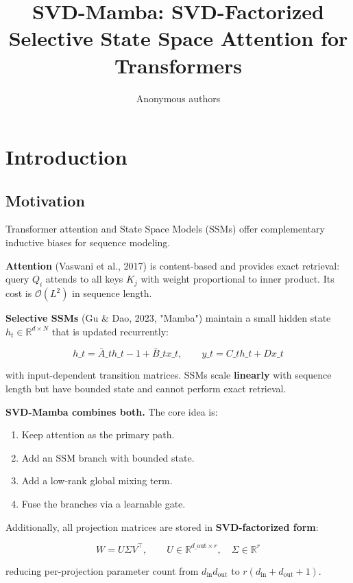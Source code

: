 \title{\textbf{SVD-Mamba: SVD-Factorized Selective State Space Attention for Transformers}}

\author{Anonymous authors}



\section{Introduction}

\subsection{Motivation}

Transformer attention and State Space Models (SSMs) offer complementary 
inductive biases for sequence modeling.

\textbf{Attention} (Vaswani et al., 2017) is content-based and provides exact 
retrieval: query $Q_i$ attends to all keys $K_j$ with weight proportional 
to inner product. Its cost is $\mathcal{O}(L^2)$ in sequence length.

\textbf{Selective SSMs} (Gu \& Dao, 2023, "Mamba") maintain a small hidden state 
$h_t \in \mathbb{R}^{d \times N}$ that is updated recurrently:

\[
h\_t = \bar{A}\_t h\_{t-1} + \bar{B}\_t x\_t, \qquad
y\_t = C\_t h\_t + D x\_t
\tag{1.1}
\]

with input-dependent transition matrices. SSMs scale \textbf{linearly} with 
sequence length but have bounded state and cannot perform exact retrieval.

\textbf{SVD-Mamba combines both.} The core idea is:

\begin{enumerate}
\item Keep attention as the primary path.
\item Add an SSM branch with bounded state.
\item Add a low-rank global mixing term.
\item Fuse the branches via a learnable gate.

\end{enumerate}
Additionally, all projection matrices are stored in \textbf{SVD-factorized form}:

\[
W = U \Sigma V^\top, \qquad U \in \mathbb{R}^{d\_\text{out} \times r}, \quad \Sigma \in \mathbb{R}^r
\tag{1.2}
\]

reducing per-projection parameter count from $d_\text{in} d_\text{out}$ 
to $r(d_\text{in} + d_\text{out} + 1)$.

